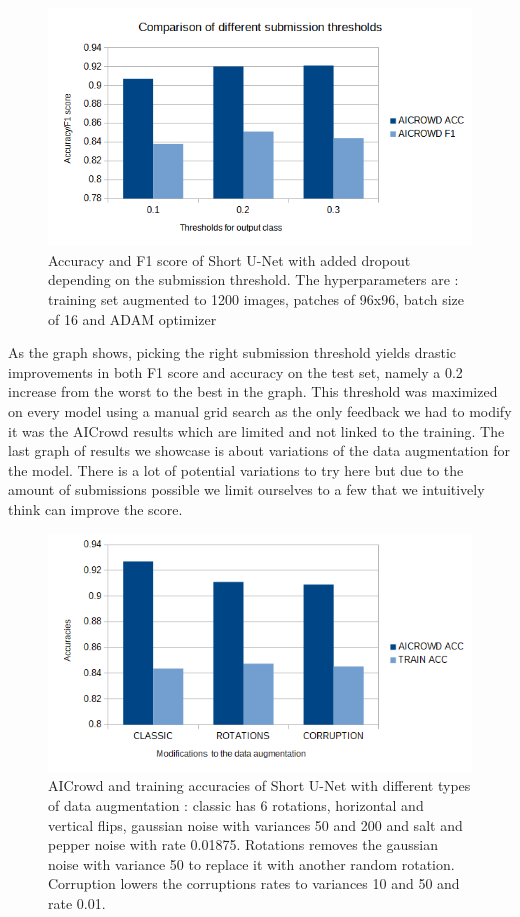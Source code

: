 \documentclass[10pt,conference,compsocconf]{IEEEtran}
\begin{document}
\begin{figure}[H]
    \centering
    \includegraphics[scale = 0.4]{thresholds_graph.png} %
    \caption{Accuracy and F1 score of Short U-Net with added dropout depending on the submission threshold. The hyperparameters are : training set augmented to 1200 images, patches of 96x96, batch size of 16 and ADAM optimizer}
\end{figure}
As the graph shows, picking the right submission threshold yields drastic improvements in both F1 score and accuracy on the test set, namely a 0.2 increase from the worst to the best in the graph. This threshold was maximized on every model using a manual grid search as the only feedback we had to modify it was the AICrowd results which are limited and not linked to the training.
\newline
\label{results_data}
The last graph of results we showcase is about variations of the data augmentation for the model. There is a lot of potential variations to try here but due to the amount of submissions possible we limit ourselves to a few that we intuitively think can improve the score.
\begin{figure}[H]
    \centering
    \includegraphics[scale = 0.4]{data_graph.png} %
    \caption{AICrowd and training accuracies of Short U-Net with different types of data augmentation : classic has 6 rotations, horizontal and vertical flips, gaussian noise with variances 50 and 200 and salt and pepper noise with rate 0.01875. Rotations removes the gaussian noise with variance 50 to replace it with another random rotation. Corruption lowers the corruptions rates to variances 10 and 50 and rate 0.01.}
\end{figure}
\end{document}
